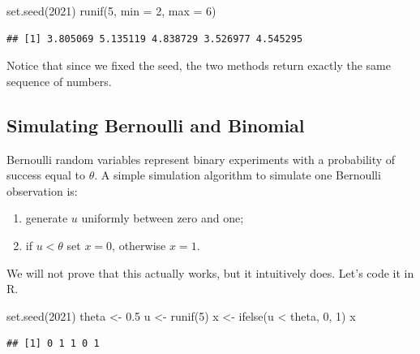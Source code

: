 \documentclass[
]{book}
\newenvironment{Shaded}{\begin{snugshade}}{\end{snugshade}}
\newcommand{\AttributeTok}[1]{\textcolor[rgb]{0.77,0.63,0.00}{#1}}
\newcommand{\DecValTok}[1]{\textcolor[rgb]{0.00,0.00,0.81}{#1}}
\newcommand{\FloatTok}[1]{\textcolor[rgb]{0.00,0.00,0.81}{#1}}
\newcommand{\FunctionTok}[1]{\textcolor[rgb]{0.00,0.00,0.00}{#1}}
\newcommand{\NormalTok}[1]{#1}
\newcommand{\OtherTok}[1]{\textcolor[rgb]{0.56,0.35,0.01}{#1}}
\newcommand{\SpecialCharTok}[1]{\textcolor[rgb]{0.00,0.00,0.00}{#1}}
\theoremstyle{definition}
\theoremstyle{definition}
\theoremstyle{definition}
\theoremstyle{definition}
\theoremstyle{remark}
\begin{document}
\begin{Shaded}
\begin{Highlighting}[]
\FunctionTok{set.seed}\NormalTok{(}\DecValTok{2021}\NormalTok{)}
\FunctionTok{runif}\NormalTok{(}\DecValTok{5}\NormalTok{, }\AttributeTok{min =} \DecValTok{2}\NormalTok{, }\AttributeTok{max =} \DecValTok{6}\NormalTok{)}
\end{Highlighting}
\end{Shaded}

\begin{verbatim}
## [1] 3.805069 5.135119 4.838729 3.526977 4.545295
\end{verbatim}

Notice that since we fixed the seed, the two methods return exactly the same sequence of numbers.

\hypertarget{simulating-bernoulli-and-binomial}{%
\subsection{Simulating Bernoulli and Binomial}\label{simulating-bernoulli-and-binomial}}

Bernoulli random variables represent binary experiments with a probability of success equal to \(\theta\). A simple simulation algorithm to simulate one Bernoulli observation is:

\begin{enumerate}
\def\labelenumi{\arabic{enumi}.}
\item
  generate \(u\) uniformly between zero and one;
\item
  if \(u< \theta\) set \(x=0\), otherwise \(x=1\).
\end{enumerate}

We will not prove that this actually works, but it intuitively does. Let's code it in R.

\begin{Shaded}
\begin{Highlighting}[]
\FunctionTok{set.seed}\NormalTok{(}\DecValTok{2021}\NormalTok{)}
\NormalTok{theta }\OtherTok{\textless{}{-}} \FloatTok{0.5}
\NormalTok{u }\OtherTok{\textless{}{-}} \FunctionTok{runif}\NormalTok{(}\DecValTok{5}\NormalTok{)}
\NormalTok{x }\OtherTok{\textless{}{-}} \FunctionTok{ifelse}\NormalTok{(u }\SpecialCharTok{\textless{}}\NormalTok{ theta, }\DecValTok{0}\NormalTok{, }\DecValTok{1}\NormalTok{)}
\NormalTok{x}
\end{Highlighting}
\end{Shaded}

\begin{verbatim}
## [1] 0 1 1 0 1
\end{verbatim}
\end{document}
